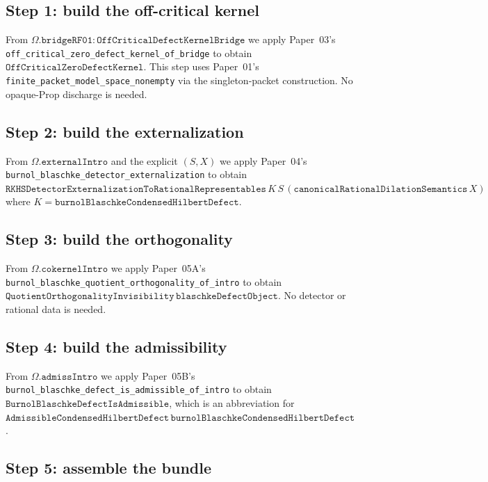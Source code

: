 \documentclass[11pt]{article}
\theoremstyle{plain}
\theoremstyle{definition}
\theoremstyle{remark}
\newcommand{\code}[1]{\texttt{#1}}
\newcommand{\Obs}{\Omega}
\begin{document}
\subsection{Step 1: build the off-critical kernel}

From \(\Obs.\code{bridgeRF01} : \code{OffCriticalDefectKernelBridge}\)
we apply Paper~03's
\code{off\_critical\_zero\_defect\_kernel\_of\_bridge} to obtain
\(\code{OffCriticalZeroDefectKernel}\).  This step uses
Paper~01's \code{finite\_packet\_model\_space\_nonempty} via the
singleton-packet construction.  No opaque-Prop discharge is needed.

\subsection{Step 2: build the externalization}

From \(\Obs.\code{externalIntro}\) and the explicit
\((S, X)\) we apply Paper~04's
\code{burnol\_blaschke\_detector\_externalization} to obtain
\(\code{RKHSDetectorExternalizationToRationalRepresentables}\,K\,S\,
   (\code{canonicalRationalDilationSemantics}\,X)\)
where \(K = \code{burnolBlaschkeCondensedHilbertDefect}\).

\subsection{Step 3: build the orthogonality}

From \(\Obs.\code{cokernelIntro}\) we apply Paper~05A's
\code{burnol\_blaschke\_quotient\_orthogonality\_of\_intro} to obtain
\(\code{QuotientOrthogonalityInvisibility}\,
   \code{blaschkeDefectObject}\).  No detector or rational data is
needed.

\subsection{Step 4: build the admissibility}

From \(\Obs.\code{admissIntro}\) we apply Paper~05B's
\code{burnol\_blaschke\_defect\_is\_admissible\_of\_intro} to obtain
\(\code{BurnolBlaschkeDefectIsAdmissible}\), which is an abbreviation
for \(\code{AdmissibleCondensedHilbertDefect}\,
   \code{burnolBlaschkeCondensedHilbertDefect}\).

\subsection{Step 5: assemble the bundle}
\end{document}
